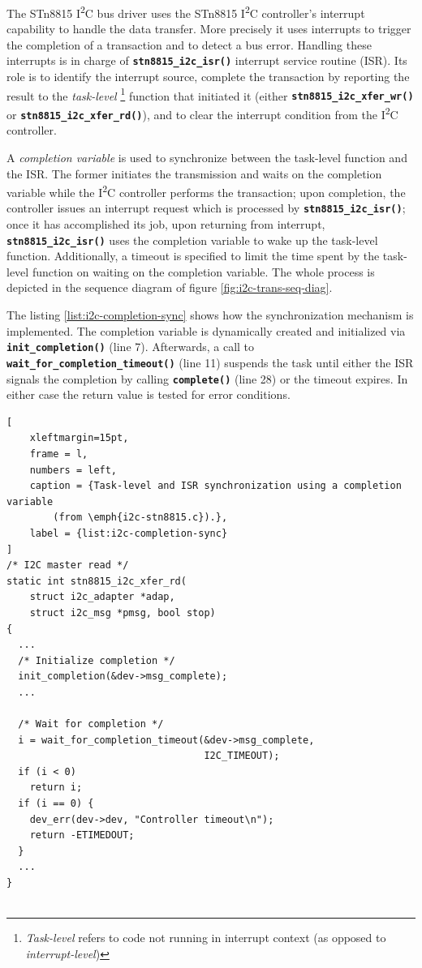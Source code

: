 \documentclass[a4paper,10pt]{article}
\newcommand{\iic}{I\textsuperscript{2}C }
\newcommand{\keyword}[1]{\texttt{\textbf{#1}}}
\begin{document}
\begin{multicols}{2}
The STn8815 \iic bus driver uses the STn8815 \iic controller's interrupt
capability to handle the data transfer. More precisely it uses interrupts to
trigger the completion of a transaction and to detect a bus error. Handling
these interrupts is in charge of \keyword{stn8815\_i2c\_isr()} interrupt service
routine (ISR).
Its role is to identify the interrupt source, complete the transaction
by reporting the result to the \emph{task-level}
\footnote{\emph{Task-level} refers to code not running in interrupt context
(as opposed to \emph{interrupt-level})}
function that initiated it (either \keyword{stn8815\_i2c\_xfer\_wr()} or
\keyword{stn8815\_i2c\_xfer\_rd()}), and to clear the interrupt condition from
the \iic controller.

A \emph{completion variable} is used to synchronize between the task-level
function and the ISR. The former initiates the transmission and waits on the
completion variable while the \iic controller performs the transaction; upon
completion, the controller issues an interrupt request which is processed by
\keyword{stn8815\_i2c\_isr()}; once it has accomplished its job, upon returning
from interrupt, \keyword{stn8815\_i2c\_isr()} uses the completion variable to
wake up the task-level function.
Additionally, a timeout is specified to limit the time spent by the task-level
function on waiting on the completion variable.
The whole process is depicted in the sequence diagram of figure
\ref{fig:i2c-trans-seq-diag}.

The listing \ref{list:i2c-completion-sync} shows how the synchronization
mechanism is implemented.
The completion variable is dynamically created and initialized via
\keyword{init\_completion()} (line 7). Afterwards, a call to
\keyword{wait\_for\_completion\_timeout()} (line 11) suspends the task until
either the ISR signals the completion by calling \keyword{complete()} (line 28)
or the timeout expires.  In either case the return value is tested for error
conditions.

\begin{lstlisting}[
	xleftmargin=15pt,
	frame = l,
	numbers = left,
	caption = {Task-level and ISR synchronization using a completion variable
		(from \emph{i2c-stn8815.c}).},
	label = {list:i2c-completion-sync}
]
/* I2C master read */
static int stn8815_i2c_xfer_rd(
    struct i2c_adapter *adap,
    struct i2c_msg *pmsg, bool stop)
{
  ...
  /* Initialize completion */
  init_completion(&dev->msg_complete);
  ...

  /* Wait for completion */
  i = wait_for_completion_timeout(&dev->msg_complete,
                                  I2C_TIMEOUT);
  if (i < 0)
    return i;
  if (i == 0) {
    dev_err(dev->dev, "Controller timeout\n");
    return -ETIMEDOUT;
  }
  ...
}


\end{lstlisting}
\end{multicols}
\end{document}
